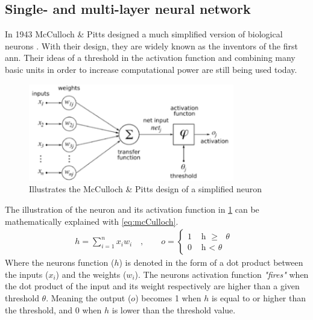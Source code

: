 \documentclass[USenglish]{ifimaster}  %
\begin{document}
\subsection{Single- and multi-layer neural network}
In 1943 McCulloch \& Pitts designed a much simplified version of biological neurons \cite{mcculloch_pitts}. With their design, they are widely known as the inventors of the first \ac{ann}. Their ideas of a threshold in the activation function and combining many basic units in order to increase computational power are still being used today.
\begin{figure}[ht]
    \centering
    \includegraphics[width=0.8\textwidth]{bilder/mcculloch_and_pitts.png}
    \caption{Illustrates the McCulloch \& Pitts design of a simplified neuron \cite{website:mcCulloch_img}}
    \label{fig:mcculoch_and_pitts}
\end{figure}
The illustration of the neuron and its activation function in \cref{fig:mcculoch_and_pitts} can be mathematically explained with \cref{eq:mcCulloch}.
\begin{equation}\label{eq:mcCulloch}
\begin{aligned}
    {h = \sum_{i=1}^{n} x_i w_i \quad , \quad\quad o =
\begin{cases}
    1 & \text{ h $\geq$ $\theta$ }  \\
    0 & \text{ h < $\theta$ }
\end{cases}}
\end{aligned}
\end{equation}
Where the neurons function ($h$) is denoted in the form of a dot product between the inputs ($x_i$) and the weights ($w_i$). The neurons activation function \textit{"fires"} when the dot product of the input and its weight respectively are higher than a given threshold $\theta$. Meaning the output ($o$) becomes 1 when $h$ is equal to or higher than the threshold, and 0 when $h$ is lower than the threshold value.
\end{document}
